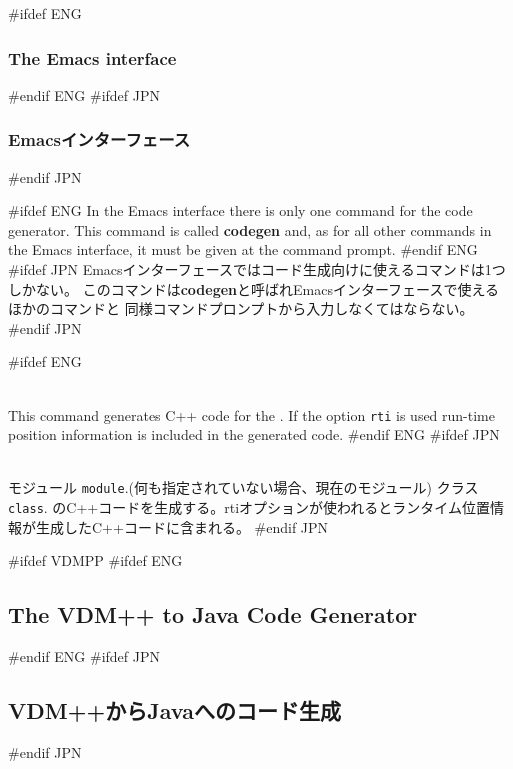 \documentclass[\pformat,12pt]{article}
\begin{document}
#ifdef ENG
\subsubsection{The Emacs interface}
#endif ENG
#ifdef JPN
\subsubsection{Emacsインターフェース}
#endif JPN

#ifdef ENG
In the Emacs interface there is only one command for the code generator.
This command is called \textbf{codegen}
and, as for all other commands in the Emacs interface, it must be given at
the command prompt.
#endif ENG
#ifdef JPN
Emacsインターフェースではコード生成向けに使えるコマンドは1つしかない。
このコマンドは\textbf{codegen}と呼ばれEmacsインターフェースで使えるほかのコマンドと
同様コマンドプロンプトから入力しなくてはならない。
#endif JPN

\begin{description}
#ifdef ENG
\item[*codegen (cg) \ifthenelse{\boolean{VDMsl}}{{[}{\tt
      module}{]}}{{\tt class}} {[}{\tt rti}{]}]   \mbox{}\\
  This command generates C++ code for the
  .
  If the option {\tt rti} is used run-time
  position information is included in the generated code.
#endif ENG
#ifdef JPN
\item[*codegen (cg) \ifthenelse{\boolean{VDMsl}}{{[}{\tt
      module}{]}}{{\tt class}} {[}{\tt rti}{]}] 
  \mbox{}\\
  {モジュール {\tt module}.(何も指定されていない場合、現在のモジュール) }
  {クラス {\tt class}}.  
  のC++コードを生成する。rtiオプションが使われるとランタイム位置情報が生成したC++コードに含まれる。
#endif JPN
\end{description}

\newpage
#ifdef VDMPP
#ifdef ENG
\subsection{The VDM++ to Java Code Generator}\label{sec:cgjava}
#endif ENG
#ifdef JPN
\subsection{VDM++からJavaへのコード生成}\label{sec:cgjava}
#endif JPN
\end{document}
